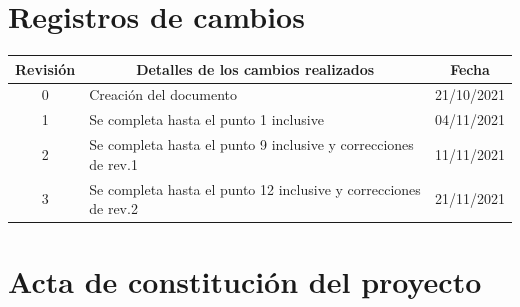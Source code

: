 \documentclass[
11pt, %
codirector, %
]{charter}
\begin{document}
\maketitle
\thispagestyle{empty}
\pagebreak


\thispagestyle{empty}
{\setlength{\parskip}{0pt}
\tableofcontents{}
}
\pagebreak


\section*{Registros de cambios}
\label{sec:registro}


\begin{table}[ht]
\label{tab:registro}
\centering
\begin{tabularx}{\linewidth}{@{}|c|X|c|@{}}
\hline
\rowcolor[HTML]{C0C0C0} 
Revisión & \multicolumn{1}{c|}{\cellcolor[HTML]{C0C0C0}Detalles de los cambios realizados} & Fecha      \\ \hline
0      & Creación del documento                                 & 21/10/2021 \\ \hline %
1      & Se completa hasta el punto 1 inclusive                 & 04/11/2021 \\ \hline
2      & Se completa hasta el punto 9 inclusive y correcciones de rev.1	& 11/11/2021 \\ \hline
3      & Se completa hasta el punto 12 inclusive y correcciones de rev.2	& 21/11/2021 \\ \hline
\end{tabularx}
\end{table}

\pagebreak



\section*{Acta de constitución del proyecto}
\label{sec:acta}
\end{document}
